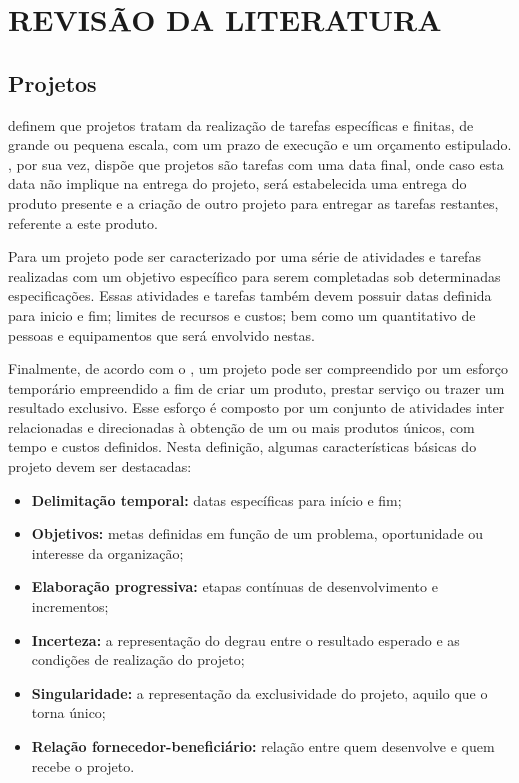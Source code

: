 \chapter{REVISÃO DA LITERATURA}
\thispagestyle{empty}

\section{Projetos}

   definem que projetos tratam da realização de tarefas específicas e finitas, de grande ou pequena escala, com um prazo de execução e um orçamento estipulado. , por sua vez, dispõe que projetos são tarefas com uma data final, onde caso esta data não implique na entrega do projeto, será estabelecida uma entrega do produto presente e a criação de outro projeto para entregar as tarefas restantes, referente a este produto.

  Para  um projeto pode ser caracterizado por uma série de atividades e tarefas realizadas com um objetivo específico para serem completadas sob determinadas especificações. Essas atividades e tarefas também devem possuir datas definida para inicio e fim; limites de recursos e custos; bem como um quantitativo de pessoas e equipamentos que será envolvido nestas.

  Finalmente, de acordo com o , um projeto pode ser compreendido por um esforço temporário empreendido a fim de criar um produto, prestar serviço ou trazer um resultado exclusivo. Esse esforço é composto por um conjunto de atividades inter relacionadas e direcionadas à obtenção de um ou mais produtos únicos, com tempo e custos definidos. Nesta definição, algumas características básicas do projeto devem ser destacadas:

  \begin{itemize}
    \item{\textbf{Delimitação temporal:} datas específicas para início e fim;}
    \item{\textbf{Objetivos:} metas definidas em função de um problema, oportunidade ou interesse da organização;}
    \item{\textbf{Elaboração progressiva:} etapas contínuas de desenvolvimento e incrementos;}
    \item{\textbf{Incerteza:} a representação do degrau entre o resultado esperado e as condições de realização do projeto;}
    \item{\textbf{Singularidade:} a representação da exclusividade do projeto, aquilo que o torna único;}
    \item{\textbf{Relação fornecedor-beneficiário:} relação entre quem desenvolve e quem recebe o projeto.}
  \end{itemize}

